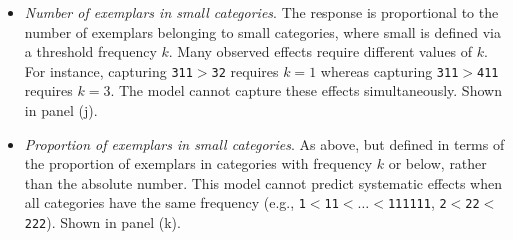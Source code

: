 \documentclass[doc]{apa6}
\newcommand{\dist}[1]{\texttt{#1}}
\begin{document}
\begin{table}[p]
\begin{itemize}
\item {\it Number of exemplars in small categories}. The response is proportional to the number of exemplars belonging to small categories, where small is defined via a threshold frequency $k$. Many observed effects require different values of $k$. For instance, capturing \dist{311}$>$\dist{32} requires $k=1$ whereas capturing \dist{311}$>$\dist{411} requires $k=3$. The model cannot capture these effects simultaneously. Shown in panel (j).
\item {\it Proportion of exemplars in small categories}. As above, but defined in terms of the proportion of exemplars in categories with frequency $k$ or below, rather than the absolute number. This model cannot predict systematic effects when all categories have the same frequency (e.g., \dist{1}$<$\dist{11}$<\ldots<$\dist{111111}, \dist{2}$<$\dist{22}$<$\dist{222}). Shown in panel (k).
\end{itemize}
\end{table}
\end{document}
